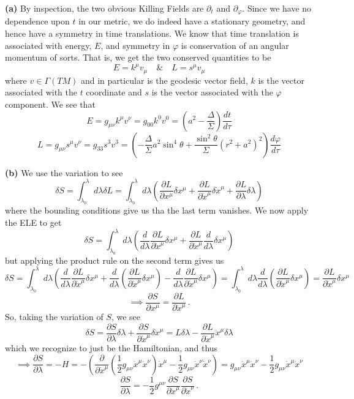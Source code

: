 \documentclass[10pt]{article}
\newcommand{\di}[2][]{\frac{\partial #1}{\partial #2}}
\newcommand{\del}[2][]{\frac{d #1}{d #2}}
\begin{document}
\textbf{(a)} By inspection, the two obvious Killing Fields are $\partial_{t}$ and $\partial_{\varphi}$. Since we have no dependence upon $t$ in our metric, we do indeed have a stationary geometry, and hence have a symmetry in time translations. We know that time translation is associated with energy, $E$, and symmetry in $\varphi$ is conservation of an angular momentum of sorts. That is, we get the two conserved quantities to be
\[ E = k^{\mu}v_{\mu} \quad \& \quad L = s^{\mu}v_{\mu} \]
where $v \in \Gamma(TM)$ and in particular is the geodesic vector field, $k$ is the vector associated with the $t$ coordinate and $s$ is the vector associated with the $\varphi$ component. We see that
\[ E = g_{\mu\nu}k^{\mu}v^{\nu} = g_{00}k^{0}v^{0} = \left(a^{2} - \frac{\Delta}{\Sigma}\right)\frac{dt}{d\tau} \]
\[ L = g_{\mu\nu}s^{\mu}v^{\nu} = g_{33}s^{3}v^{3} = \left(-\frac{\Delta}{\Sigma}a^{2}\sin^{4}\theta + \frac{\sin^{2}\theta}{\Sigma}(r^{2} + a^{2})^{2}\right)\frac{d\varphi}{d\tau} \]

\textbf{(b)} We use the variation to see
\[ \delta S = \int_{\lambda_{0}}^{\lambda}d\lambda \delta L = \int_{\lambda_{0}}^{\lambda}d\lambda\left(\frac{\partial L}{\partial x^{\mu}}\delta x^{\mu} + \frac{\partial L}{\partial \dot{x}^{\mu}}\delta \dot{x}^{\mu} + \frac{\partial L}{\partial \lambda}\delta \lambda\right) \]
where the bounding conditions give us tha the last term vanishes. We now apply the ELE to get
\[ \delta S = \int_{\lambda_{0}}^{\lambda}d\lambda\left(\del{\lambda}\frac{\partial L}{\partial \dot{x}^{\mu}}\delta x^{\mu} + \frac{\partial L}{\partial \dot{x}^{\mu}}\del{\lambda}\delta x^{\mu}\right) \]
but applying the product rule on the second term gives us
\[ \delta S = \int_{\lambda_{0}}^{\lambda}d\lambda\left( \del{\lambda}\frac{\partial L}{\partial \dot{x}^{\mu}}\delta x^{\mu}+ \del{\lambda}\left(\frac{\partial L}{\partial \dot{x}^{\mu}}\delta x^{\mu}\right) - \del{\lambda}\frac{\partial L}{\partial \dot{x}^{\mu}}\delta x^{\mu}\right) = \int_{\lambda_{0}}^{\lambda}d\lambda\del{\lambda}\left(\frac{\partial L}{\partial \dot{x}^{\mu}}\delta x^{\mu}\right) = \frac{\partial L}{\partial \dot{x}^{\mu}}\delta x^{\mu}\]
\[ \implies \frac{\partial S}{\partial x^{\mu}} = \frac{\partial L}{\partial \dot{x}^{\mu}}\, .\]
So, taking the variation of $S$, we see
\[ \delta S = \di[S]{\lambda}\delta \lambda + \di[S]{\dot{x}^{\mu}}\delta \dot{x}^{\mu} = L\delta \lambda - \di[L]{\dot{x}^{\mu}}\dot{x}^{\mu}\delta \lambda\]
which we recognize to just be the Hamiltonian, and thus
\[ \implies \di[S]{\lambda} = -H = -\left(\di{\dot{x}^{\mu}}\left(\frac{1}{2}g_{\mu\nu}\dot{x}^{\mu}\dot{x}^{\nu}\right)\dot{x}^{\mu} - \frac{1}{2}g_{\mu\nu}\dot{x}^{\nu}\dot{x}^{\nu}\right) = g_{\mu\nu}\dot{x}^{\mu}\dot{x}^{\nu} - \frac{1}{2}g_{\mu\nu}\dot{x}^{\mu}\dot{x}^{\nu} \]
\[\di[S]{\lambda} = -\frac{1}{2}g^{\mu\nu}\di[S]{\dot{x}^{\mu}}\di[S]{\dot{x}^{\nu}} \, .\]
\end{document}

